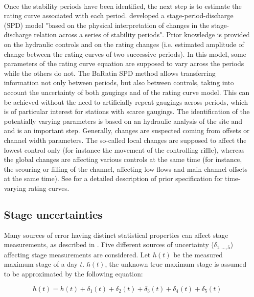\documentclass[11pt]{article}
\begin{document}
    \paragraph{}
    Once the stability periods have been identified, the next step is to estimate the rating curve associated with each period. \citet{mansanarez_shift_2019} developed a stage-period-discharge (SPD) model "based on the physical interpretation of changes in the stage-discharge relation across a series of stability periods". Prior knowledge is provided on the hydraulic controls and on the rating changes (i.e. estimated amplitude of change between the rating curves of two successive periods). In this model, some parameters of the rating curve equation are supposed to vary across the periods while the others do not. The BaRatin SPD method allows transferring information not only between periods, but also between controls, taking into account the uncertainty of both gaugings and of the rating curve model. This can be achieved without the need to artificially repeat gaugings across periods, which is of particular interest for stations with scarce gaugings. The identification of the potentially varying parameters is based on an hydraulic analysis of the site and and is an important step. Generally, changes are suspected coming from offsets or channel width parameters. The so-called local changes are supposed to affect the lowest control only (for instance the movement of the controlling riffle), whereas the global changes are affecting various controls at the same time (for instance, the scouring or filling of the channel, affecting low flows and main channel offsets at the same time). See \citet{mansanarez_shift_2019} for a detailed description of prior specification for time-varying rating curves. 
    
    \subsection{Stage uncertainties}
    \label{sec:StageErr}
    
    Many sources of error having distinct statistical properties can affect stage measurements, as described in \citet{horner_impact_2018}. Five different sources of uncertainty ($\delta_{1,...,5}$) affecting stage measurements are considered. Let $h(t)$ be the measured maximum stage of a day $t$. $\hbar(t)$, the unknown true maximum stage is assumed to be approximated by the following equation:
    
    \begin{equation}
        \hbar(t) = h(t) + \delta_1(t) + \delta_2(t) + \delta_3(t) + \delta_4(t) + \delta_5(t)
        \label{eq:StageError}
    \end{equation}
    
\end{document}
